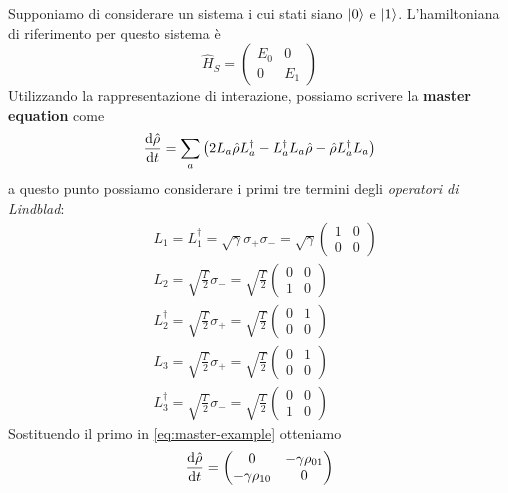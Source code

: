 \begin{esempio}
Supponiamo di considerare un sistema i cui stati siano $\ket 0$ e $\ket 1$. L'hamiltoniana di riferimento per questo sistema è
\begin{equation*}
    \hat H_S = \begin{pmatrix}E_0 & 0 \\ 0 & E_1\end{pmatrix}
\end{equation*}
Utilizzando la rappresentazione di interazione, possiamo scrivere la \textbf{master equation} come
\begin{equation}
        \dv{\hat\rho}{t} = \sum_a \left( 2L_a \hat \rho L_a^\dagger - L_a^\dagger L_a\hat \rho - \hat \rho L_a^\dagger L_a\right)
        \label{eq:master-example}
\end{equation}
a questo punto possiamo considerare i primi tre termini degli \textit{operatori di Lindblad}:
\begin{align*}
    & L_1 =L_1^\dagger =\sqrt \gamma \sigma_+\sigma_-=\sqrt\gamma\begin{pmatrix}1 & 0\\ 0 & 0\end{pmatrix}\\
    & L_2 = \sqrt{\frac{\Gamma}{2}}\sigma_- = \sqrt{\frac{\Gamma}{2}}\begin{pmatrix}0 & 0\\ 1 & 0\end{pmatrix} \\
    & L_2^\dagger = \sqrt{\frac{\Gamma}{2}}\sigma_+ = \sqrt{\frac{\Gamma}{2}}\begin{pmatrix}0 & 1\\ 0 & 0\end{pmatrix} \\
    & L_3 = \sqrt{\frac{\Gamma}{2}}\sigma_+ = \sqrt{\frac{\Gamma}{2}}\begin{pmatrix}0 & 1\\ 0 & 0\end{pmatrix} \\
    & L_3^\dagger = \sqrt{\frac{\Gamma}{2}}\sigma_- = \sqrt{\frac{\Gamma}{2}}\begin{pmatrix}0 & 0\\ 1 & 0\end{pmatrix}
\end{align*}
Sostituendo il primo in \eqref{eq:master-example} otteniamo
\begin{equation*}
    \dv{\hat\rho}{t} = \begin{pmatrix}0 & -\gamma\rho_{01}\\-\gamma\rho_{10} & 0\end{pmatrix}

\end{equation*}
\end{esempio}
